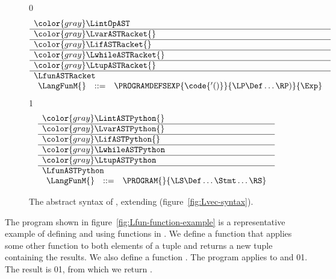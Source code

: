 \documentclass[7x10]{TimesAPriori_MIT}%
\newcommand{\gray}[1]{{\color{gray} #1}}
\def\racketEd{0}
\def\pythonEd{1}
\providecommand{\BookEdition}{1}
\let\edition\BookEdition
\newcommand{\racket}[1]{{\if\edition\racketEd{#1}\fi}}
\newcommand{\pythonColor}[0]{}
\newcommand{\python}[1]{{\if\edition\pythonEd\pythonColor #1\fi}}
\numberwithin{theorem}{chapter}
\numberwithin{definition}{chapter}
\numberwithin{equation}{chapter}
\begin{document}
\begin{figure}[tp]
\centering
\begin{tcolorbox}[colback=white]
    \small
{\if\edition\racketEd
\[
\begin{array}{l}
  \gray{\LintOpAST} \\ \hline
  \gray{\LvarASTRacket{}} \\ \hline
  \gray{\LifASTRacket{}} \\ \hline
  \gray{\LwhileASTRacket{}} \\ \hline
  \gray{\LtupASTRacket{}} \\ \hline
  \LfunASTRacket \\
  \begin{array}{lcl}
  \LangFunM{} &::=& \PROGRAMDEFSEXP{\code{'()}}{\LP\Def\ldots\RP)}{\Exp}
  \end{array}
\end{array}
\]
\fi}
{\if\edition\pythonEd\pythonColor
\[
\begin{array}{l}
  \gray{\LintASTPython{}} \\ \hline
  \gray{\LvarASTPython{}} \\ \hline
  \gray{\LifASTPython{}} \\ \hline
  \gray{\LwhileASTPython} \\ \hline
  \gray{\LtupASTPython} \\  \hline
  \LfunASTPython \\
\begin{array}{rcl}
  \LangFunM{} &::=& \PROGRAM{}{\LS \Def \ldots \Stmt \ldots \RS}
\end{array}
\end{array}
\]
\fi}
\end{tcolorbox}

\caption{The abstract syntax of \LangFun{}, extending \LangVec{} (figure~\ref{fig:Lvec-syntax}).}
\label{fig:Lfun-syntax}
\end{figure}


The program shown in figure~\ref{fig:Lfun-function-example} is a
representative example of defining and using functions in \LangFun{}.
We define a function  that applies some other function
 to both elements of a tuple and returns a new tuple
containing the results. We also define a function .  The
program applies  to  and
%
\racket{}\python{}.
%
The result is \racket{}\python{},
%
from which we return .
\end{document}
